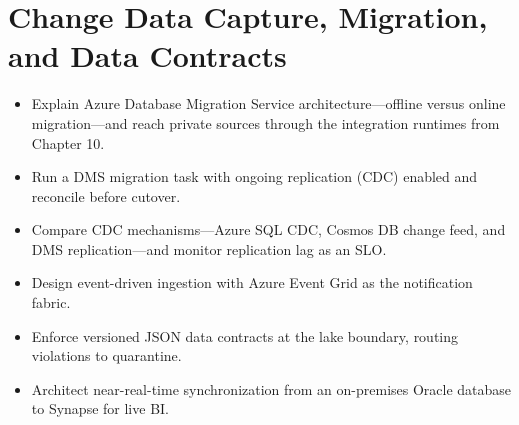 \chapter{Change Data Capture, Migration, and Data Contracts}
%
\begin{objectives}
\begin{itemize}
    \item Explain Azure Database Migration Service architecture---offline versus online migration---and reach private sources through the integration runtimes from Chapter 10.
    \item Run a DMS migration task with ongoing replication (CDC) enabled and reconcile before cutover.
    \item Compare CDC mechanisms---Azure SQL CDC, Cosmos DB change feed, and DMS replication---and monitor replication lag as an SLO.
    \item Design event-driven ingestion with Azure Event Grid as the notification fabric.
    \item Enforce versioned JSON data contracts at the lake boundary, routing violations to quarantine.
    \item Architect near-real-time synchronization from an on-premises Oracle database to Synapse for live BI.
\end{itemize}
\end{objectives}

